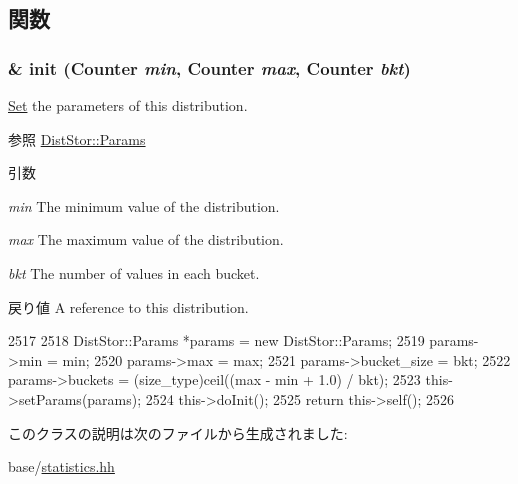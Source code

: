 \subsection{関数}
\hypertarget{classStats_1_1Distribution_a330a131f9f1614fae623ba309b61a590}{
\subsubsection[{init}]{\& init ({\bf Counter} {\em min}, \/  {\bf Counter} {\em max}, \/  {\bf Counter} {\em bkt})}}
\label{classStats_1_1Distribution_a330a131f9f1614fae623ba309b61a590}
\hyperlink{classSet}{Set} the parameters of this distribution. \begin{DoxySeeAlso}{参照}
\hyperlink{structStats_1_1DistStor_1_1Params}{DistStor::Params} 
\end{DoxySeeAlso}

\begin{DoxyParams}{引数}
\item[{\em min}]The minimum value of the distribution. \item[{\em max}]The maximum value of the distribution. \item[{\em bkt}]The number of values in each bucket. \end{DoxyParams}
\begin{DoxyReturn}{戻り値}
A reference to this distribution. 
\end{DoxyReturn}



\begin{DoxyCode}
2517     {
2518         DistStor::Params *params = new DistStor::Params;
2519         params->min = min;
2520         params->max = max;
2521         params->bucket_size = bkt;
2522         params->buckets = (size_type)ceil((max - min + 1.0) / bkt);
2523         this->setParams(params);
2524         this->doInit();
2525         return this->self();
2526     }
\end{DoxyCode}


このクラスの説明は次のファイルから生成されました:\begin{DoxyCompactItemize}
\item 
base/\hyperlink{statistics_8hh}{statistics.hh}\end{DoxyCompactItemize}
